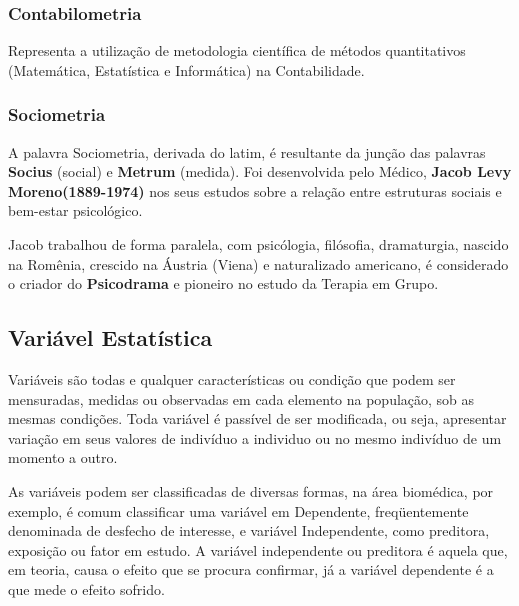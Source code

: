 \subsubsection{Contabilometria} 

Representa a utilização de metodologia científica de métodos quantitativos (Matemática, Estatística e Informática) na Contabilidade.


\subsubsection{Sociometria}

A palavra Sociometria, derivada do latim, é resultante da junção das palavras \textbf{Socius} (social) e \textbf{Metrum} (medida). Foi desenvolvida pelo Médico, \textbf{Jacob Levy Moreno(1889-1974)} nos seus estudos sobre a relação entre estruturas sociais e bem-estar psicológico.\vst

Jacob trabalhou de forma paralela, com psicólogia, filósofia, dramaturgia, nascido na Romênia, crescido na Áustria (Viena) e naturalizado americano, é considerado o criador do \textbf{Psicodrama} e pioneiro no estudo da Terapia em Grupo. 



\subsection{Variável Estatística}

\inic Variáveis são todas e qualquer características ou condição que podem ser mensuradas, medidas ou observadas em cada elemento na população, sob as mesmas condições. Toda variável é passível de ser modificada, ou seja, apresentar variação em seus valores de indivíduo a individuo ou no mesmo indivíduo de um momento a outro.\vskip0.3cm


\inic As variáveis podem ser classificadas de diversas formas, na área biomédica, por exemplo, é comum classificar uma variável em Dependente, freqüentemente denominada de desfecho de interesse, e variável Independente, como preditora, exposição ou fator em estudo. A variável independente ou preditora é aquela que, em teoria, causa o efeito que se procura confirmar, já a variável dependente é a que mede o efeito sofrido.\vskip0.3cm





